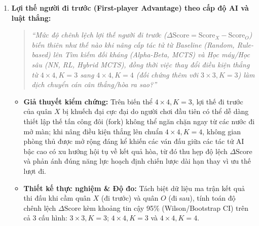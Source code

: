 \documentclass[a4paper,12pt]{report}
\begin{document}
\begin{enumerate}[label=\textbf{RQ\arabic*:}, leftmargin=1.5cm, start=1]
    \item \textbf{Lợi thế người đi trước (First-player Advantage) theo cấp độ AI và luật thắng:}
    \begin{quote}
        \textit{``Mức độ chênh lệch lợi thế người đi trước ($\Delta\text{Score} = \text{Score}_X - \text{Score}_O$) biến thiên như thế nào khi nâng cấp tác tử từ Baseline (Random, Rule-based) lên Tìm kiếm đối kháng (Alpha-Beta, MCTS) và Học máy/Học sâu (NN, RL, Hybrid MCTS), đồng thời việc thay đổi điều kiện thắng từ $4 \times 4, K=3$ sang $4 \times 4, K=4$ (đối chứng thêm với $3 \times 3, K=3$) làm dịch chuyển cán cân thắng/hòa ra sao?''}
    \end{quote}
    \begin{itemize}
        \item \textbf{Giả thuyết kiểm chứng:} Trên biến thể $4 \times 4, K=3$, lợi thế đi trước của quân $X$ bị khuếch đại cực đại do người chơi đầu tiên có thể dễ dàng thiết lập thế tấn công đôi (fork) không thể ngăn chặn ngay từ các nước đi mở màn; khi nâng điều kiện thắng lên chuẩn $4 \times 4, K=4$, không gian phòng thủ được mở rộng đáng kể khiến các ván đấu giữa các tác tử AI bậc cao có xu hướng hội tụ về kết quả hòa, từ đó thu hẹp độ lệch $\Delta\text{Score}$ và phản ánh đúng năng lực hoạch định chiến lược dài hạn thay vì ưu thế lượt đi.
        \item \textbf{Thiết kế thực nghiệm \& Độ đo:} Tách biệt dữ liệu ma trận kết quả thi đấu khi cầm quân $X$ (đi trước) và quân $O$ (đi sau), tính toán độ chênh lệch $\Delta\text{Score}$ kèm khoảng tin cậy 95\% (Wilson/Bootstrap CI) trên cả 3 cấu hình: $3 \times 3, K=3$; $4 \times 4, K=3$ và $4 \times 4, K=4$.
    \end{itemize}


\end{enumerate}
\end{document}
